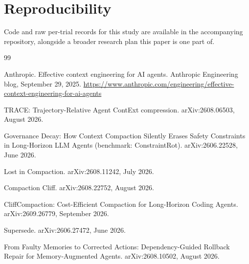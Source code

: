 \documentclass[11pt]{article}
\begin{document}
\section*{Reproducibility}
Code and raw per-trial records for this study are available in the accompanying repository, alongside a broader research plan this paper is one part of.

\begin{thebibliography}{99}

 Anthropic. Effective context engineering for AI agents. Anthropic Engineering blog, September 29, 2025. \url{https://www.anthropic.com/engineering/effective-context-engineering-for-ai-agents}

 TRACE: Trajectory-Relative Agent ContExt compression. arXiv:2608.06503, August 2026.

 Governance Decay: How Context Compaction Silently Erases Safety Constraints in Long-Horizon LLM Agents (benchmark: ConstraintRot). arXiv:2606.22528, June 2026.

 Lost in Compaction. arXiv:2608.11242, July 2026.

 Compaction Cliff. arXiv:2608.22752, August 2026.

 CliffCompaction: Cost-Efficient Compaction for Long-Horizon Coding Agents. arXiv:2609.26779, September 2026.

 Supersede. arXiv:2606.27472, June 2026.

 From Faulty Memories to Corrected Actions: Dependency-Guided Rollback Repair for Memory-Augmented Agents. arXiv:2608.10502, August 2026.

\end{thebibliography}
\end{document}
